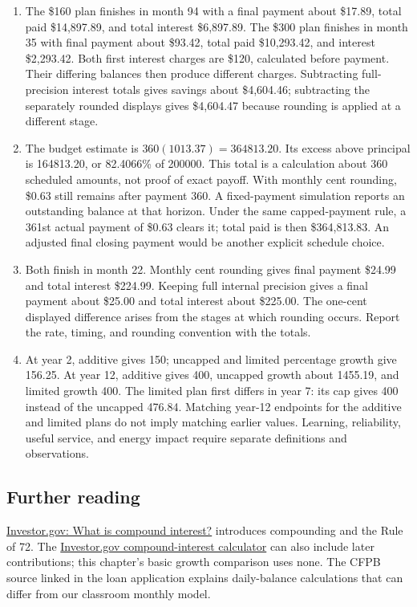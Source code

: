 \documentclass[11pt,letterpaper]{article}
\begin{document}
{\begin{enumerate}
\item The \$160 plan finishes in month 94 with a final payment about \$17.89, total paid \$14,897.89, and total interest \$6,897.89. The \$300 plan finishes in month 35 with final payment about \$93.42, total paid \$10,293.42, and interest \$2,293.42. Both first interest charges are \$120, calculated before payment. Their differing balances then produce different charges. Subtracting full-precision interest totals gives savings about \$4,604.46; subtracting the separately rounded displays gives \$4,604.47 because rounding is applied at a different stage.
\item The budget estimate is $360(1013.37)=364813.20$. Its excess above principal is 164813.20, or 82.4066\% of 200000. This total is a calculation about 360 scheduled amounts, not proof of exact payoff. With monthly cent rounding, \$0.63 still remains after payment 360. A fixed-payment simulation reports an outstanding balance at that horizon. Under the same capped-payment rule, a 361st actual payment of \$0.63 clears it; total paid is then \$364,813.83. An adjusted final closing payment would be another explicit schedule choice.
\item Both finish in month 22. Monthly cent rounding gives final payment \$24.99 and total interest \$224.99. Keeping full internal precision gives a final payment about \$25.00 and total interest about \$225.00. The one-cent displayed difference arises from the stages at which rounding occurs. Report the rate, timing, and rounding convention with the totals.
\item At year 2, additive gives 150; uncapped and limited percentage growth give 156.25. At year 12, additive gives 400, uncapped growth about 1455.19, and limited growth 400. The limited plan first differs in year 7: its cap gives 400 instead of the uncapped 476.84. Matching year-12 endpoints for the additive and limited plans do not imply matching earlier values. Learning, reliability, useful service, and energy impact require separate definitions and observations.
\end{enumerate}
\subsection*{Further reading}
\href{https://www.investor.gov/additional-resources/information/youth/teachers-classroom-resources/what-compound-interest}{Investor.gov: What is compound interest?} introduces compounding and the Rule of 72. The \href{https://www.investor.gov/financial-tools-calculators/calculators/compound-interest-calculator}{Investor.gov compound-interest calculator} can also include later contributions; this chapter's basic growth comparison uses none. The CFPB source linked in the loan application explains daily-balance calculations that can differ from our classroom monthly model.

}
\end{document}
